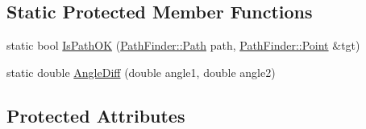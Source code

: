 \subsection*{Static Protected Member Functions}
\begin{DoxyCompactItemize}
\item 
static bool \hyperlink{classTeamRobot_afb5f9191ca185053af37c1ae1f8dcb17}{IsPathOK} (\hyperlink{classPathFinder_a269aba09b7b3208092f67f2bc02cf63e}{PathFinder::Path} path, \hyperlink{structPathFinder_1_1Point}{PathFinder::Point} \&tgt)
\item 
static double \hyperlink{classTeamRobot_a45d5d631b1e1e28c9c0f4ecbd47fdbde}{AngleDiff} (double angle1, double angle2)
\end{DoxyCompactItemize}
\subsection*{Protected Attributes}
